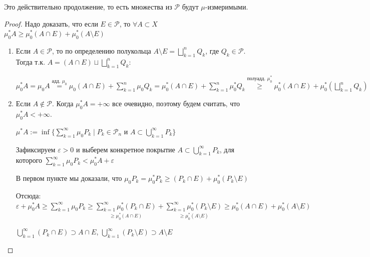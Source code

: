 \begin{theorem}
    Это действительно продолжение, то есть множества из $\mathcal{P}$ будут $\mu$-измеримыми.
\end{theorem}

\begin{proof}
    Надо доказать, что если $E\in \mathcal{P}$, то $\forall A\subset X$ $\mu_0^* A \geq \mu_0^* (A\cap E)+\mu_0^* (A\setminus E)$

    \begin{enumerate}
        \item Если $A\in \mathcal{P}$, то по определению полукольца $A\setminus E =\bigsqcup \limits_{k=1}^n Q_k$, где $Q_k\in \mathcal{P}$. 
        Тогда т.к. $A=(A\cap E)\sqcup \bigsqcup \limits_{k=1}^n Q_k$:

        $\mu_0^* A = \mu_0 A \overset{\text{адд. } \mu_0}{=}\mu_0(A\cap E)+\sum \limits_{k=1}^n \mu_0 Q_k=\mu^*_0(A\cap E)+\sum \limits_{k=1}^n \mu^*_0 Q_k
        \overset{\text{полуадд. }\mu^*_0}{\geq} \mu_0^* (A\cap E)+\mu_0^* (\bigsqcup \limits_{k=1}^n Q_k)= \mu_0^* (A\cap E)+\mu_0^* (A\setminus E)$

        \item Если $A\not\in \mathcal{P}$. Когда $\mu_0^* A=+\infty$ все очевидно, поэтому будем считать, что $\mu_0^* A<+\infty$.
        
        $\mu^* A:=\inf \{\sum\limits_{k=1}^\infty \mu_0 P_k\mid P_k\in \mathcal{P}_n\text{ и } A\subset \bigcup\limits_{k=1}^\infty P_k\}$

        Зафиксируем $\varepsilon > 0$ и выберем конкретное покрытие $A\subset \bigcup\limits_{k=1}^\infty P_k$, для которого $\sum \limits_{k=1}^\infty \mu_0 P_k<\mu_0^* A+\varepsilon$

        В первом пункте мы доказали, что $\mu_0 P_k = \mu_0^* P_k \geq (P_k \cap E) + \mu_0^* (P_k \setminus E)$

        Отсюда: $\varepsilon+\mu_0^* A\geq  \sum \limits_{k=1}^\infty \mu_0 P_k\geq \underset{\geq \mu_0^* (A\cap E)}{\sum \limits_{k=1}^\infty \mu_0^* (P_k\cap E)}+
        \underset{\geq \mu_0^* (A\setminus E)}{\sum \limits_{k=1}^\infty \mu_0^* (P_k\setminus E)}\geq \mu_0^* (A\cap E)+\mu_0^* (A\setminus E)$

        $\bigcup\limits_{k=1}^\infty (P_k\cap E)\supset A \cap E$, $\bigcup\limits_{k=1}^\infty (P_k\setminus E)\supset A \setminus E$
    \end{enumerate}
\end{proof}

